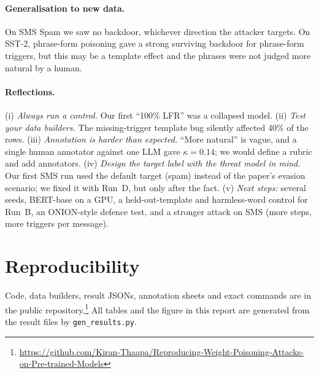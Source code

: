 \documentclass[11pt]{article}
\begin{document}
\paragraph{Generalisation to new data.}
On SMS Spam we saw no backdoor, whichever direction the attacker targets. On SST-2, phrase-form poisoning gave a strong surviving backdoor for phrase-form triggers, but this may be a template effect and the phrases were not judged more natural by a human.

\paragraph{Reflections.}
(i) \emph{Always run a control.} Our first ``100\% LFR'' was a collapsed model. (ii) \emph{Test your data builders.} The missing-trigger template bug silently affected 40\% of the rows. (iii) \emph{Annotation is harder than expected.} ``More natural'' is vague, and a single human annotator against one LLM gave $\kappa=0.14$; we would define a rubric and add annotators. (iv) \emph{Design the target label with the threat model in mind.} Our first SMS run used the default target (spam) instead of the paper's evasion scenario; we fixed it with Run~D, but only after the fact. (v) \emph{Next steps:} several seeds, BERT-base on a GPU, a held-out-template and harmless-word control for Run~B, an ONION-style defence test, and a stronger attack on SMS (more steps, more triggers per message).

\section*{Reproducibility}
Code, data builders, result JSONs, annotation sheets and exact commands are in the public repository.\footnote{\url{https://github.com/Kiran-Thaapa/Reproducing-Weight-Poisoning-Attacks-on-Pre-trained-Models}} All tables and the figure in this report are generated from the result files by \texttt{gen\_results.py}.



\appendix
\end{document}
